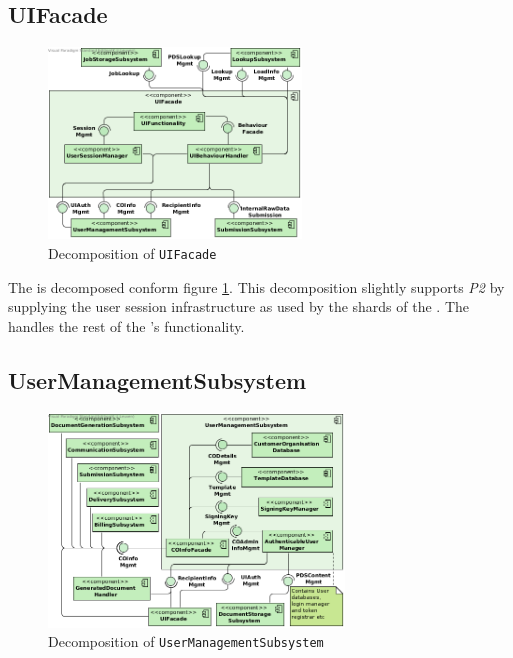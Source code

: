 \subsection{UIFacade}
\begin{figure}[!htp]
    \centering
    \includegraphics[width=0.6\textwidth]{figures/UI Facade.png}
    \caption{Decomposition of \texttt{UIFacade}}\label{fig:decomp-uif}
\end{figure}

The  is decomposed conform figure \ref{fig:decomp-uif}. This decomposition slightly supports \emph{P2} by supplying the user session infrastructure as used by the shards of the . The  handles the rest of the 's functionality.

\subsection{UserManagementSubsystem}\label{sec:decomp-usersub}
\begin{figure}[!htp]
    \centering
    \includegraphics[width=0.7\textwidth]{figures/User Managment Subsystem.png}
    \caption{Decomposition of \texttt{UserManagementSubsystem}}\label{fig:decomp-usersub}
\end{figure}

